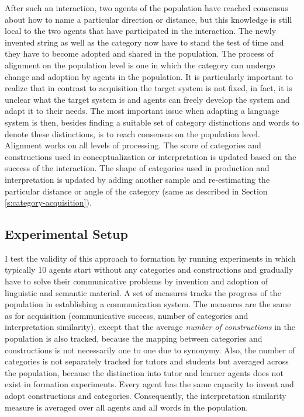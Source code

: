 After such an interaction, two agents of the population have reached consensus about 
how to name a particular direction or distance, but this knowledge is still local to the two
agents that have participated in the interaction. The newly invented string as well
as the category now have to stand the test of time and they have to become
adopted and shared in the population. The process of alignment on the 
population level is one in which the category can undergo change and adoption
by agents in the population. It is particularly important to realize that 
in contrast to acquisition the target system is not fixed, in fact, it is unclear what
the target system is and agents can freely develop the system and adapt it to
their needs. The most important issue when adapting a language system is 
then, besides finding a suitable set of category distinctions and words to denote
these distinctions, is to reach consensus on the population level. Alignment
works on all levels of processing. The score of categories and constructions used in 
conceptualization or interpretation is updated based on the success of the interaction.
The shape of categories used in production and interpretation is updated by 
adding another sample and re-estimating the particular distance or angle
of the category (same as described in Section \ref{s:category-acquisition}).

\subsection{Experimental Setup}
I test the validity of this approach to formation by running experiments 
in which typically 10 agents start without any categories and constructions 
and gradually have to solve their communicative problems by invention and
adoption of linguistic and semantic material. A set of measures tracks the 
progress of the population in establishing a communication system. The
measures are the same as for acquisition (communicative success,
number of categories and interpretation similarity), except that 
the average \emph{number of constructions} in the population is also tracked, 
because the mapping between categories and constructions is not necessarily one
to one due to synonymy. Also, the number of categories is
not separately tracked for tutors and students but averaged across the population, 
because the distinction into tutor and learner agents does not exist in formation 
experiments. Every agent has the same capacity to invent and adopt 
constructions and categories. Consequently, the interpretation similarity 
measure is averaged over all agents and all words in the population.


